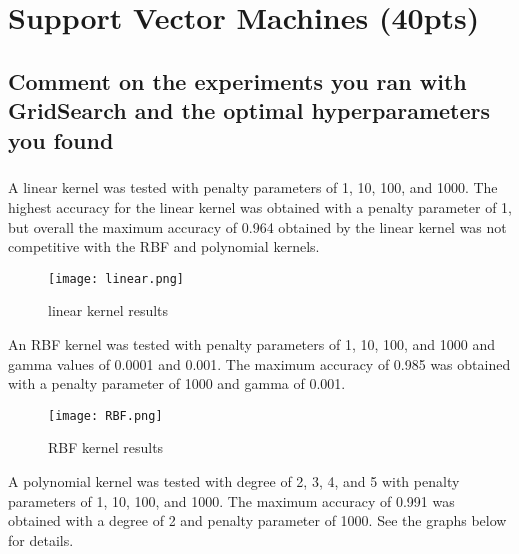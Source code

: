 \documentclass[11pt]{article}
\begin{document}
\thispagestyle{empty}

\newlength{\boxlength}\setlength{\boxlength}{\textwidth}
\addtolength{\boxlength}{-4mm}

\begin{center}
\end{center}




\section{Support Vector Machines (40pts)}

\subsection{Comment on the experiments you ran with GridSearch and the optimal hyperparameters you found}

\subparagraph{}

A linear kernel was tested with penalty parameters of 1, 10, 100, and 1000. The highest accuracy for the linear kernel was obtained with a penalty parameter of 1, but overall the maximum accuracy of 0.964 obtained by the linear kernel was not competitive with the RBF and polynomial kernels.

\begin{figure}[H]
\centering
	\texttt{[image: linear.png]}
	\caption{linear kernel results}
\end{figure}

An RBF kernel was tested with penalty parameters of 1, 10, 100, and 1000 and gamma values of 0.0001 and 0.001. The maximum accuracy of 0.985 was obtained with a penalty parameter of 1000 and gamma of 0.001. 

\begin{figure}[H]
\centering
	\texttt{[image: RBF.png]}
	\caption{RBF kernel results}
\end{figure}

A polynomial kernel was tested with degree of 2, 3, 4, and 5 with penalty parameters of 1, 10, 100, and 1000. The maximum accuracy of 0.991 was obtained with a degree of 2 and penalty parameter of 1000. See the graphs below for details.
\end{document}
